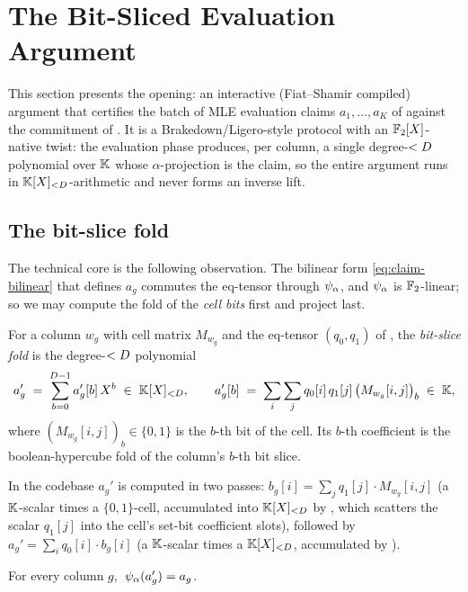 \section{The Bit-Sliced Evaluation Argument}
\label{sec:eval}

This section presents the opening: an interactive (Fiat--Shamir
compiled) argument that certifies the batch of MLE evaluation claims
$a_1,\dots,a_K$ of  against the commitment of
. It is a Brakedown/Ligero-style protocol with an
$\mathbb{F}_2[X]$-native twist: the evaluation phase produces, per column, a
single degree-$<D$ polynomial over $\mathbb{K}$ whose $\alpha$-projection is
the claim, so the entire argument runs in $\mathbb{K}[X]_{<D}$-arithmetic and never
forms an inverse lift.

\subsection{The bit-slice fold}

The technical core is the following observation. The bilinear form
\eqref{eq:claim-bilinear} that defines $a_g$ commutes the eq-tensor
through $\psi_{\alpha}$, and $\psi_{\alpha}$ is $\mathbb{F}_2$-linear; so we may compute the
fold of the \emph{cell bits} first and project last.

\begin{definition}
\label{def:bitslice}
For a column $w_g$ with cell matrix $M_{w_g}$ and the eq-tensor
$(q_0, q_1)$ of , the \emph{bit-slice fold} is the
degree-$<D$ polynomial
\[
  a_g' \;=\; \sum_{b=0}^{D-1} a_g'[b]\,X^b \;\in\; \mathbb{K}[X]_{<D},
  \qquad
  a_g'[b] \;=\; \sum_{i}\sum_{j} q_0[i]\,q_1[j]\,\bigl(M_{w_g}[i,j]\bigr)_b \;\in\; \mathbb{K},
\]
where $(M_{w_g}[i,j])_b \in \{0,1\}$ is the $b$-th bit of the cell. Its
$b$-th coefficient is the boolean-hypercube fold of the column's $b$-th
bit slice.
\end{definition}

In the codebase $a_g'$ is computed in two passes:
$b_g[i] = \sum_j q_1[j]\cdot M_{w_g}[i,j]$ (a $\mathbb{K}$-scalar times a
$\{0,1\}$-cell, accumulated into $\mathbb{K}[X]_{<D}$ by
, which scatters the scalar $q_1[j]$
into the cell's set-bit coefficient slots), followed by
$a_g' = \sum_i q_0[i]\cdot b_g[i]$ (a $\mathbb{K}$-scalar times a $\mathbb{K}[X]_{<D}$,
accumulated by ).

\begin{lemma}
\label{lem:bitslice}
For every column $g$, $\;\psi_{\alpha}(a_g') = a_g$.
\end{lemma}

